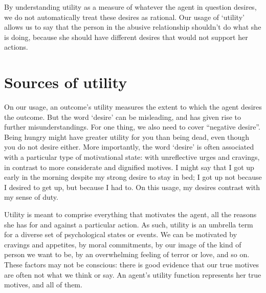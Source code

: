 By understanding utility as a measure of whatever the agent in
question desires, we do not automatically treat these desires as
rational. Our usage of `utility' allows us to say that the
person in the abusive relationship shouldn't do what she is doing,
because she should have different desires that would not support her
actions.

\section{Sources of utility}\label{sec:sources-utility}

On our usage, an outcome's utility measures the extent to which the
agent desires the outcome. But the word `desire' can be misleading,
and has given rise to further misunderstandings. For one thing, we
also need to cover ``negative desire''. Being hungry might have
greater utility for you than being dead, even though you do not desire
either. More importantly, the word `desire' is often associated with a
particular type of motivational state: with unreflective urges and
cravings, in contrast to more considerate and dignified motives. I
might say that I got up early in the morning despite my strong desire
to stay in bed; I got up not because I desired to get up, but because
I had to. On this usage, my desires contrast with my sense of duty.

Utility is meant to comprise everything that motivates the agent, all
the reasons she has for and against a particular action. As such,
utility is an umbrella term for a diverse set of psychological
states or events. We can be motivated by cravings and appetites, by
moral commitments, by our image of the kind of person we want to be,
by an overwhelming feeling of terror or love, and so on. These
factors may not be conscious: there is good evidence that our true motives
are often not what we think or say. An agent's utility function
represents her true motives, and all of them.


